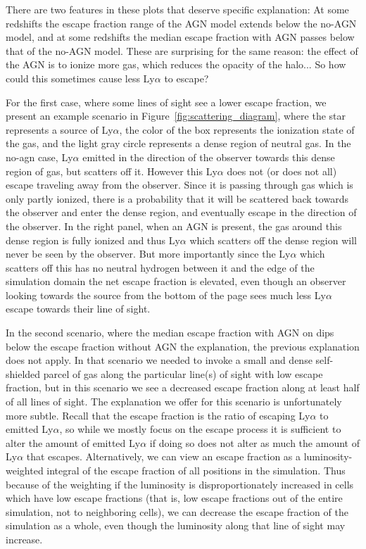 There are two features in these plots that deserve specific explanation: At some redshifts the escape fraction range of the AGN model extends below the no-AGN model, and at some redshifts the median escape fraction with AGN passes below that of the no-AGN model.
These are surprising for the same reason: the effect of the AGN is to ionize more gas, which reduces the opacity of the halo... So how could this sometimes cause less Ly$\alpha$ to escape?

For the first case, where some lines of sight see a lower escape fraction, we present an example scenario in Figure~\ref{fig:scattering_diagram}, where the star represents a source of Ly$\alpha$, the color of the box represents the ionization state of the gas, and the light gray circle represents a dense region of neutral gas.
In the no-agn case, Ly$\alpha$ emitted in the direction of the observer towards this dense region of gas, but scatters off it.
However this Ly$\alpha$ does not (or does not all) escape traveling away from the observer.
Since it is passing through gas which is only partly ionized, there is a probability that it will be scattered back towards the observer and enter the dense region, and eventually escape in the direction of the observer.
In the right panel, when an AGN is present, the gas around this dense region is fully ionized and thus Ly$\alpha$ which scatters off the dense region will never be seen by the observer.
But more importantly since the Ly$\alpha$ which scatters off this has no neutral hydrogen between it and the edge of the simulation domain the net escape fraction is elevated, even though an observer looking towards the source from the bottom of the page sees much less Ly$\alpha$ escape towards their line of sight.

In the second scenario, where the median escape fraction with AGN on dips below the escape fraction without AGN the explanation, the previous explanation does not apply.
In that scenario we needed to invoke a small and dense self-shielded parcel of gas along the particular line(s) of sight with low escape fraction, but in this scenario we see a decreased escape fraction along at least half of all lines of sight.
The explanation we offer for this scenario is unfortunately more subtle.
Recall that the escape fraction is the ratio of escaping Ly$\alpha$ to emitted Ly$\alpha$, so while we mostly focus on the escape process it is sufficient to alter the amount of emitted Ly$\alpha$ if doing so does not alter as much the amount of Ly$\alpha$ that escapes.
Alternatively, we can view an escape fraction as a luminosity-weighted integral of the escape fraction of all positions in the simulation.
Thus because of the weighting if the luminosity is disproportionately increased in cells which have low escape fractions (that is, low escape fractions out of the entire simulation, not to neighboring cells), we can decrease the escape fraction of the simulation as a whole, even though the luminosity along that line of sight may increase.

